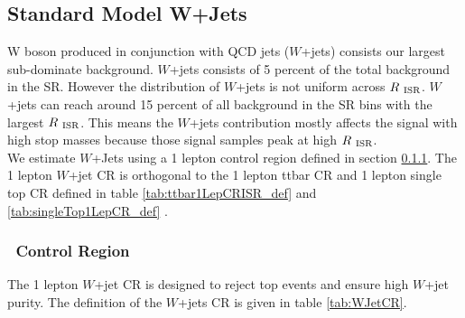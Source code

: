 \subsection{Standard Model W+Jets}
\label{sec:Bkg:wjet}

\indent W boson produced in conjunction with QCD jets ($W$+jets) consists our largest sub-dominate background.  $W$+jets consists of 5 percent of the total background in the SR.  However the distribution of $W$+jets is not uniform across $R_{~\mathrm{ISR}}$.  $W$+jets can reach around 15 percent of all background in the SR bins with the largest $R_{~\mathrm{ISR}}$.  This means the $W$+jets contribution mostly affects the signal with high stop masses because those signal samples peak at high $R_{~\mathrm{ISR}}$. \\

\indent We estimate $W$+Jets using a 1 lepton control region defined in section \ref{sec:WCR}.  The 1 lepton $W$+jet CR is orthogonal to the 1 lepton ttbar CR and 1 lepton single top CR defined in table \ref{tab:ttbar1LepCRISR_def} and \ref{tab:singleTop1LepCR_def} .  \\

\subsubsection{\Wjets\ Control Region}
\label{sec:WCR}

\indent The 1 lepton $W$+jet CR is designed to reject top events and ensure high $W$+jet purity.  The definition of the $W$+jets CR is given in table \ref{tab:WJetCR}. \\

